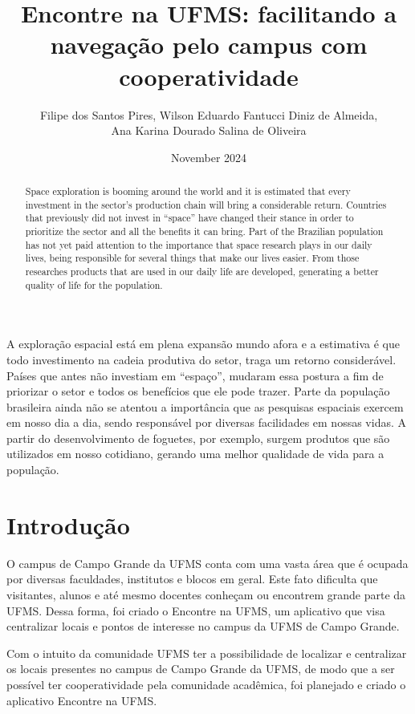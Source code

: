 \documentclass[12pt]{article}
\title{Encontre na UFMS: facilitando a navegação pelo campus com cooperatividade}
\author{Filipe dos Santos Pires\inst{1}, Wilson Eduardo Fantucci Diniz de Almeida\inst{1},\\Ana Karina Dourado Salina de Oliveira\inst{1}}
\date{November 2024}
\begin{document}
\maketitle

\begin{resumo} 
  A exploração espacial está em plena expansão mundo afora e a estimativa é que todo investimento na cadeia produtiva do setor, traga um retorno considerável. Países que antes não investiam em “espaço”, mudaram essa postura a fim de priorizar o setor e todos os benefícios que ele pode trazer.
  Parte da população brasileira ainda não se atentou a importância que as pesquisas espaciais exercem em nosso dia a dia, sendo responsável por diversas facilidades em nossas vidas. A partir do desenvolvimento de foguetes, por exemplo, surgem produtos que são utilizados em nosso cotidiano, gerando uma melhor qualidade de vida para a população.
\end{resumo}

\begin{abstract}
  Space exploration is booming around the world and it is estimated that every investment in the sector's production chain will bring a considerable return. Countries that previously did not invest in “space” have changed their stance in order to prioritize the sector and all the benefits it can bring.
  Part of the Brazilian population has not yet paid attention to the importance that space research plays in our daily lives, being responsible for several things that make our lives easier. From those researches products that are used in our daily life are developed, generating a better quality of life for the population.
\end{abstract}

\section{Introdução}
O campus de Campo Grande da UFMS conta com uma vasta área que é ocupada por diversas faculdades, institutos e blocos em geral. Este fato dificulta que visitantes, alunos e até mesmo docentes conheçam ou encontrem grande parte da UFMS. Dessa forma, foi criado o Encontre na UFMS, um aplicativo que visa centralizar locais e pontos de interesse no campus da UFMS de Campo Grande.

Com o intuito da comunidade UFMS ter a possibilidade de localizar e centralizar os locais presentes no campus de Campo Grande da UFMS, de modo que a ser possível ter cooperatividade pela comunidade acadêmica, foi planejado e criado o aplicativo Encontre na UFMS.
\end{document}
